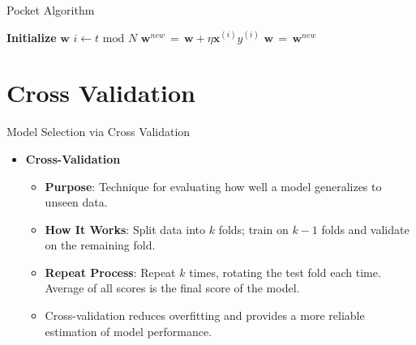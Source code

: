 \documentclass[serif, aspectratio=169]{beamer}
\begin{document}
\begin{frame}{Pocket Algorithm}
    \begin{algorithm}[H]
    \caption{Pocket Algorithm}\label{alg:Pocket Algorithm}
    \begin{algorithmic}[1]
        \State \textbf{Initialize} $\mathbf{w}$
            \State \(i \leftarrow t \text{ mod } N\)
            \State \(\mathbf{w}^{new} \, = \, \mathbf{w} + \eta \mathbf{x}^{(i)}y^{(i)}\)
             
            \State \(\mathbf{w} \, = \, \mathbf{w}^{new}\)
            \EndIf
            \EndIf
        \EndFor
    \end{algorithmic}
    \end{algorithm}
\end{frame}



\section{Cross Validation}

\begin{frame}{Model Selection via Cross Validation}
    \begin{itemize}
        \item \textbf{Cross-Validation}
        \medskip
        \begin{itemize}\itemsep1em
            \item \justifying \textbf{Purpose}:
            Technique for evaluating how well a model generalizes to unseen data.
            \item \justifying \textbf{How It Works}:
            Split data into $k$ folds; train on $k-1$ folds and validate on the remaining fold.
            \item \justifying \textbf{Repeat Process}:
            Repeat $k$ times, rotating the test fold each time. Average of all scores is the final score of the model.
            \item \justifying Cross-validation
            reduces overfitting and provides a more reliable estimation of model performance.
        \end{itemize}
    \end{itemize}
\end{frame}
\end{document}

